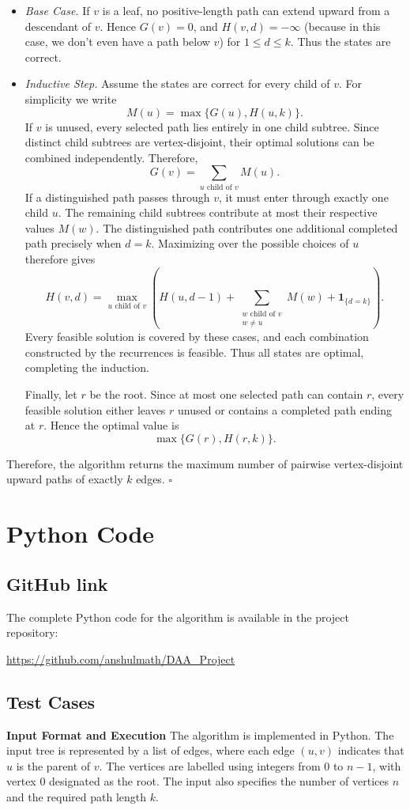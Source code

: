 \documentclass[11pt]{scrartcl}
\theoremstyle{plain}
\theoremstyle{definition}
\theoremstyle{remark}
\newcounter{solution}
\begin{document}
\begin{itemize}
  \item \textit{Base Case.} If $v$ is a leaf, no positive-length path can extend upward from a descendant of $v$. Hence $G(v)=0$, and $H(v,d)=-\infty$ (because in this case, we don't even have a path below $v$) for $1\leq d\leq k$. Thus the states are correct.
  \item \textit{Inductive Step.} Assume the states are correct for every child of $v$. For simplicity we write \[M(u)=\max\{G(u),H(u,k)\}.\]
  If $v$ is unused, every selected path lies entirely in one child subtree. Since distinct child subtrees are vertex-disjoint, their optimal solutions can be combined independently. Therefore, \[G(v)=\sum_{u\text{ child of }v}M(u).\]
  If a distinguished path passes through $v$, it must enter through exactly one child $u$. The remaining child subtrees contribute at most their respective values $M(w)$. The distinguished path contributes one additional completed path precisely when $d=k$. Maximizing over the possible choices of $u$ therefore gives
  \[H(v,d)=\max_{u\text{ child of }v}\left(H(u,d-1)+\sum_{\substack{w\text{ child of }v\\w\ne u}}M(w)+\mathbf{1}_{\{d=k\}}\right).\]
  Every feasible solution is covered by these cases, and each combination constructed by the recurrences is feasible. Thus all states are optimal, completing the induction.

  Finally, let $r$ be the root. Since at most one selected path can contain $r$, every feasible solution either leaves $r$ unused or contains a completed path ending at $r$. Hence the optimal value is \[\max\{G(r),H(r,k)\}.\]
\end{itemize}
Therefore, the algorithm returns the maximum number of pairwise vertex-disjoint upward paths of exactly $k$ edges. \hfill$\square$

\section{Python Code}
\subsection{GitHub link}
The complete Python code for the algorithm is available in the project repository:
\begin{center}
    \url{https://github.com/anshulmath/DAA_Project}
\end{center}

\subsection{Test Cases}
\textbf{Input Format and Execution} The algorithm is implemented in Python. The input tree is represented by a list of edges, where each edge \((u,v)\) indicates that \(u\) is the parent of \(v\). The vertices are labelled using integers from \(0\) to \(n-1\), with vertex \(0\) designated as the root. The input also specifies the number of vertices \(n\) and the required path length \(k\).
\end{document}
